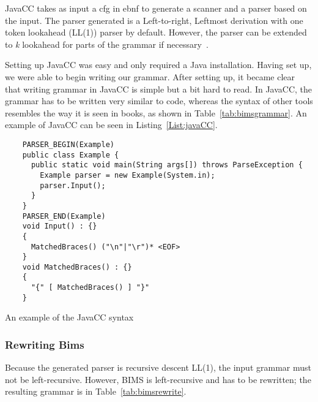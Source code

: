 JavaCC takes as input a \gls{cfg} in \gls{ebnf} to generate a scanner and a parser based on the input. The parser generated is a Left-to-right, Leftmost derivation with one token lookahead (LL(1)) parser by default. However, the parser can be extended to \textit{k} lookahead for parts of the grammar if necessary~\cite{JavaCC2021}.

Setting up JavaCC was easy and only required a Java installation. Having set up, we were able to begin writing our grammar. After setting up, it became clear that writing grammar in JavaCC is simple but a bit hard to read. In JavaCC, the grammar has to be written very similar to code, whereas the syntax of other tools resembles the way it is seen in books, as shown in Table~\ref{tab:bimsgrammar}. An example of JavaCC can be seen in Listing~\ref{List:javaCC}.

\begin{listing}[htb!]
  \centering
  \begin{verbatim}
    PARSER_BEGIN(Example)
    public class Example {
      public static void main(String args[]) throws ParseException {
        Example parser = new Example(System.in);
        parser.Input();
      }
    }
    PARSER_END(Example)
    void Input() : {}
    {
      MatchedBraces() ("\n"|"\r")* <EOF>
    }
    void MatchedBraces() : {}
    {
      "{" [ MatchedBraces() ] "}"
    }
\end{verbatim}
  \caption{An example of the JavaCC syntax}
  \label{List:javaCC}
\end{listing}


\subsubsection{Rewriting Bims}
Because the generated parser is recursive descent LL(1), the input grammar must not be left-recursive. However, BIMS is left-recursive and has to be rewritten; the resulting grammar is in Table~\ref{tab:bimsrewrite}.

